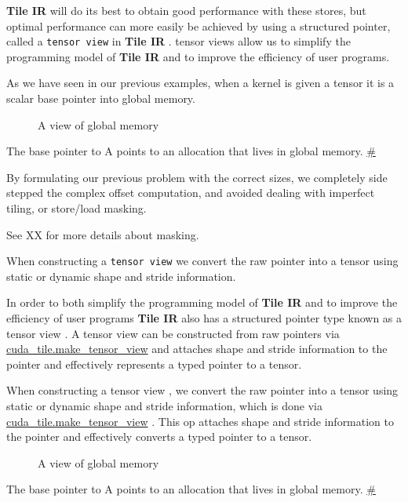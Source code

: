 \documentclass{article}
\begin{document}
\textbf{Tile IR} will do its best to obtain good performance with these stores, but optimal performance can more easily be achieved by using a structured pointer, called a \texttt{tensor view} in \textbf{Tile IR} . tensor views allow us to simplify the programming model of \textbf{Tile IR} and to improve the efficiency of user programs.


As we have seen in our previous examples, when a kernel is given a tensor it is a scalar base pointer into global memory.


\begin{figure}[!ht]\centering

\caption{A view of global memory}
\end{figure}
The base pointer to A points to an allocation that lives in global memory. \href{https://docs.nvidia.com/cuda/tile-ir/latest/sections/prog_model.html#id1}{\#}



By formulating our previous problem with the correct sizes, we completely side stepped the complex offset computation, and avoided dealing with imperfect tiling, or store/load masking.

See XX for more details about masking.


When constructing a \texttt{tensor view} we convert the raw pointer into a tensor using static or dynamic shape and stride information.


In order to both simplify the programming model of \textbf{Tile IR} and to improve the efficiency of user programs \textbf{Tile IR} also has a structured pointer type known as a tensor view . A tensor view can be constructed from raw pointers via \href{https://docs.nvidia.com/cuda/tile-ir/latest/sections/operations.html#op-cuda-tile-make-tensor-view}{cuda\_tile.make\_tensor\_view} and attaches shape and stride information to the pointer and effectively represents a typed pointer to a tensor.


When constructing a tensor view , we convert the raw pointer into a tensor using static or dynamic shape and stride information, which is done via \href{https://docs.nvidia.com/cuda/tile-ir/latest/sections/operations.html#op-cuda-tile-make-tensor-view}{cuda\_tile.make\_tensor\_view} . This op attaches shape and stride information to the pointer and effectively converts a typed pointer to a tensor.


\begin{figure}[!ht]\centering

\caption{A view of global memory}
\end{figure}
The base pointer to A points to an allocation that lives in global memory. \href{https://docs.nvidia.com/cuda/tile-ir/latest/sections/prog_model.html#id2}{\#}
\end{document}

